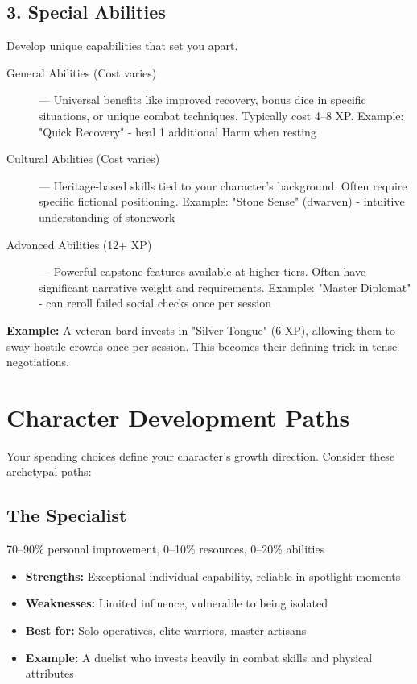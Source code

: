 \documentclass[11pt,twoside,openany]{book}
\begin{document}
\subsection*{3. Special Abilities}

Develop unique capabilities that set you apart.

\begin{description}
\item[General Abilities (Cost varies)] — Universal benefits like improved recovery, bonus dice in specific situations, or unique combat techniques. Typically cost 4–8 XP. Example: "Quick Recovery" - heal 1 additional Harm when resting
\item[Cultural Abilities (Cost varies)] — Heritage-based skills tied to your character's background. Often require specific fictional positioning. Example: "Stone Sense" (dwarven) - intuitive understanding of stonework
\item[Advanced Abilities (12+ XP)] — Powerful capstone features available at higher tiers. Often have significant narrative weight and requirements. Example: "Master Diplomat" - can reroll failed social checks once per session
\end{description}

\textbf{Example:} A veteran bard invests in "Silver Tongue" (6 XP), allowing them to sway hostile crowds once per session. This becomes their defining trick in tense negotiations.

\section*{Character Development Paths} 

Your spending choices define your character's growth direction. Consider these archetypal paths:

\subsection*{The Specialist}

70–90\% personal improvement, 0–10\% resources, 0–20\% abilities
\begin{itemize}
\item \textbf{Strengths:} Exceptional individual capability, reliable in spotlight moments
\item \textbf{Weaknesses:} Limited influence, vulnerable to being isolated
\item \textbf{Best for:} Solo operatives, elite warriors, master artisans
\item \textbf{Example:} A duelist who invests heavily in combat skills and physical attributes
\end{itemize}
\end{document}
